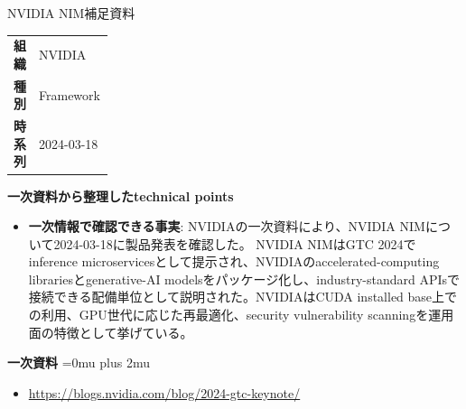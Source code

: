 \Needspace{0.38\textheight}
\begin{technicalnote}{NVIDIA NIM}{補足資料}
\begingroup
\begin{tabularx}{\linewidth}{@{}>{\bfseries}p{0.22\linewidth}X@{}}
組織 & NVIDIA \\
種別 & Framework \\
時系列 & 2024-03-18 \\
\end{tabularx}
\smallskip
{\bfseries 一次資料から整理したtechnical points}
\begin{itemize}[leftmargin=1.5em,itemsep=0.35em]
\item \textbf{一次情報で確認できる事実}: NVIDIAの一次資料により、NVIDIA NIMについて2024-03-18に製品発表を確認した。 NVIDIA NIMはGTC 2024でinference microservicesとして提示され、NVIDIAのaccelerated-computing librariesとgenerative-AI modelsをパッケージ化し、industry-standard APIsで接続できる配備単位として説明された。NVIDIAはCUDA installed base上での利用、GPU世代に応じた再最適化、security vulnerability scanningを運用面の特徴として挙げている。
\end{itemize}
\begin{minipage}{\linewidth}
\begin{samepage}
{\bfseries 一次資料}
\begingroup\sloppy
\Urlmuskip=0mu plus 2mu\relax
\begin{itemize}[leftmargin=1.5em,itemsep=0.25em]
\item {\scriptsize\url{https://blogs.nvidia.com/blog/2024-gtc-keynote/}}
\end{itemize}
\endgroup
\end{samepage}
\end{minipage}
\endgroup
\end{technicalnote}
\medskip
